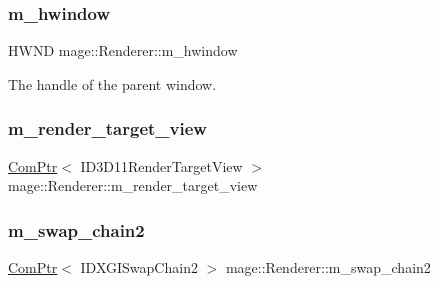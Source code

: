 \subsubsection{\texorpdfstring{m\+\_\+hwindow}{m\_hwindow}}
{\footnotesize\ttfamily H\+W\+ND mage\+::\+Renderer\+::m\+\_\+hwindow\hspace{0.3cm}{\ttfamily [private]}}

The handle of the parent window. \hypertarget{classmage_1_1_renderer_a36ed728d4d5f55bc6f248066b2dd0a43}{}\label{classmage_1_1_renderer_a36ed728d4d5f55bc6f248066b2dd0a43} 
\subsubsection{\texorpdfstring{m\+\_\+render\+\_\+target\+\_\+view}{m\_render\_target\_view}}
{\footnotesize\ttfamily \hyperlink{namespacemage_ae74f374780900893caa5555d1031fd79}{Com\+Ptr}$<$ I\+D3\+D11\+Render\+Target\+View $>$ mage\+::\+Renderer\+::m\+\_\+render\+\_\+target\+\_\+view\hspace{0.3cm}{\ttfamily [protected]}}

\hypertarget{classmage_1_1_renderer_a96a55ac9d739141f6ea6692347134eec}{}\label{classmage_1_1_renderer_a96a55ac9d739141f6ea6692347134eec} 
\subsubsection{\texorpdfstring{m\+\_\+swap\+\_\+chain2}{m\_swap\_chain2}}
{\footnotesize\ttfamily \hyperlink{namespacemage_ae74f374780900893caa5555d1031fd79}{Com\+Ptr}$<$ I\+D\+X\+G\+I\+Swap\+Chain2 $>$ mage\+::\+Renderer\+::m\+\_\+swap\+\_\+chain2\hspace{0.3cm}{\ttfamily [protected]}}

